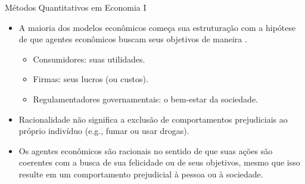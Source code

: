 \documentclass[10pt]{beamer}
\begin{document}
\begin{frame}{Métodos Quantitativos em Economia I}
    \begin{itemize}
        \item A maioria dos modelos econômicos começa sua estruturação com a hipótese de que agentes econômicos buscam seus objetivos de maneira .\medskip

              \begin{itemize}
                  \item Consumidores:  suas utilidades.

                  \item Firmas:  seus lucros (ou  custos).

                  \item Regulamentadores governamentais:  o bem-estar da sociedade.\bigskip
              \end{itemize}


        \item Racionalidade não significa a exclusão de comportamentos prejudiciais ao próprio indivíduo (e.g., fumar ou usar drogas).\bigskip

        \item Os agentes econômicos são racionais no sentido de que suas ações são coerentes com a busca de sua felicidade ou de seus objetivos, mesmo que isso resulte em um comportamento prejudicial à pessoa ou à sociedade.
    \end{itemize}
\end{frame}
\end{document}
